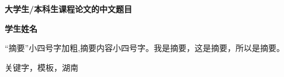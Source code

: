 
\begin{center}
    {\songti{}\textbf{大学生/本科生课程论文的中文题目} \par}
    {\songti{}\textbf{学生姓名} \par}
\end{center}

\begin{hutb_abstract}
    “摘要”小四号字加粗,摘要内容小四号字。我是摘要，这是摘要，所以是摘要。
\end{hutb_abstract}

\begin{hutb_keywords}
    关键字，模板，湖南
\end{hutb_keywords}
